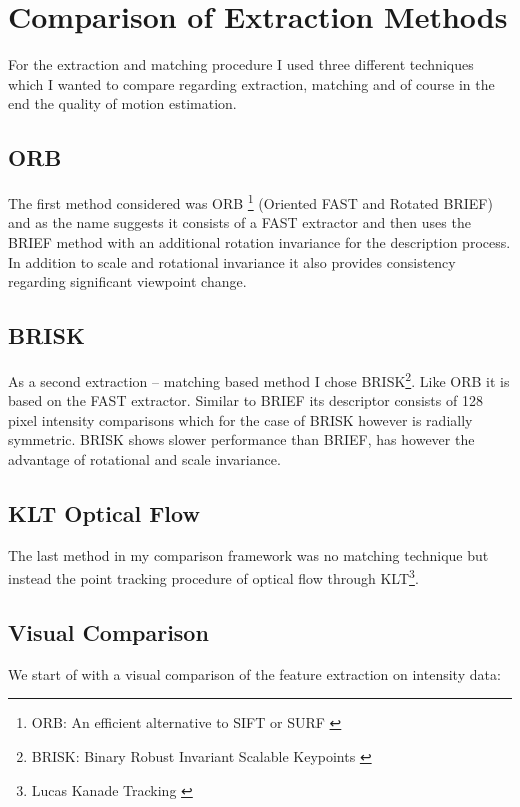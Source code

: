\section{Comparison of Extraction Methods}{
    For the extraction and matching procedure I used three different techniques which I wanted to compare regarding extraction, matching and of course in the end the quality of motion estimation.

    \subsection{ORB}{
        The first method considered was ORB \footnote{ORB: An efficient alternative to SIFT or SURF \citep{ORB}} (Oriented FAST and Rotated BRIEF) and as the name suggests it consists of a FAST extractor and then uses the BRIEF method with an additional rotation invariance for the description process.
        In addition to scale and rotational invariance it also provides consistency regarding significant viewpoint change.
    }

    \subsection{BRISK}{
        As a second extraction – matching based method I chose BRISK\footnote{BRISK: Binary Robust Invariant Scalable Keypoints \citep{BRISK}}. Like ORB it is based on the FAST extractor. Similar to BRIEF its descriptor consists of 128 pixel intensity comparisons which for the case of BRISK however is radially symmetric. BRISK shows slower performance than BRIEF, has however the advantage of rotational and scale invariance.
    }

    \subsection{KLT Optical Flow}{
        The last method in my comparison framework was no matching technique but instead the point tracking procedure of optical flow through KLT\footnote{Lucas Kanade Tracking \citep{KLT}}. 
    }
    \clearpage

    \subsection{Visual Comparison}{

        We start of with a visual comparison of the feature extraction on intensity data:

}}
